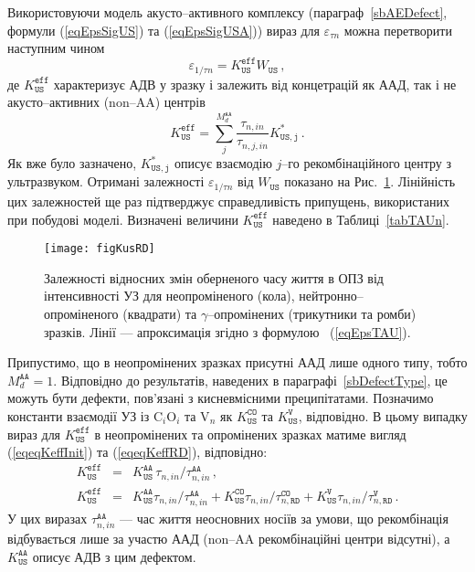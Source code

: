 Використовуючи модель акусто--активного комплексу (параграф~\ref{sbAEDefect}, формули (\ref{eqEpsSigUS}) та (\ref{eqEpsSigUSA}))
вираз для $\varepsilon_{\tau n}$ можна перетворити наступним чином
\begin{equation}
\label{eqEpsTAU}
\varepsilon_{1/\tau n}=K_\mathtt{US}^\mathtt{eff}W_\mathtt{US}\,,
\end{equation}
де
$K_\mathtt{US}^\mathtt{eff}$ характеризує АДВ у зразку і залежить від
концетрацій як ААД, так і не акусто--активних (non--AA) центрів
\begin{equation}
\label{eqKeff}
K_\mathtt{US}^\mathtt{eff}=\sum_j^{M_d^\mathtt{AA}}\frac{\tau_{n,in}}{\tau_{n,j,in}}K_\mathtt{US,j}^{*}\,.
\end{equation}
Як вже було зазначено, $K_\mathtt{US,j}^*$ описує взаємодію $j$--го рекомбінаційного центру з ультразвуком.
Отримані залежності $\varepsilon_{1/\tau n}$ від $W_\mathtt{US}$ показано на Рис.~\ref{figKusRD}.
Лінійність цих залежностей ще раз підтверджує справедливість припущень, використаних при побудові
моделі.
Визначені величини $K_\mathtt{US}^\mathtt{eff}$ наведено в Таблиці~\ref{tabTAUn}.


\begin{figure}
\center
\texttt{[image: figKusRD]}
\caption{\label{figKusRD}
Залежності відносних змін оберненого часу життя в ОПЗ від інтенсивності УЗ для
неопроміненого (кола), нейтронно--опроміненого (квадрати) та $\gamma$--опромінених (трикутники та ромби) зразків.
Лінії --- апроксимація згідно з формулою ~(\ref{eqEpsTAU}).
}%
\end{figure}

Припустимо,
що в неопромінених зразках присутні ААД лише одного типу, тобто $M_d^\mathtt{AA}=1$.
Відповідно до результатів, наведених в параграфі~\ref{sbDefectType}, це можуть бути дефекти, пов'язані з кисневмісними преципітатами.
Позначимо константи взаємодії УЗ із C$_i$O$_i$ та V$_n$ як $K_\mathtt{US}^\mathtt{CO}$ та $K_\mathtt{US}^\mathtt{V}$, відповідно.
В цьому випадку вираз для $K_\mathtt{US}^\mathtt{eff}$ в неопромінених та опромінених зразках
матиме вигляд (\ref{eqeqKeffInit}) та (\ref{eqeqKeffRD}), відповідно:
\begin{eqnarray}
K_\mathtt{US}^\mathtt{eff}&=&K_\mathtt{US}^\mathtt{AA}\,\tau_{n,in}/\tau_{n,in}^\mathtt{AA}\,,\label{eqeqKeffInit}\\
K_\mathtt{US}^\mathtt{eff}&=&K_\mathtt{US}^\mathtt{AA}\tau_{n,in}/\tau_{n,in}^\mathtt{AA}+
                           K_\mathtt{US}^\mathtt{CO}\tau_{n,in}/\tau_{n,\mathtt{RD}}^\mathtt{CO}+
                           K_\mathtt{US}^\mathtt{V}\tau_{n,in}/\tau_{n,\mathtt{RD}}^\mathtt{V} \,.\label{eqeqKeffRD}
\end{eqnarray}
У цих виразах $\tau_{n,in}^\mathtt{AA}$ --- час життя неосновних носіїв за умови, що рекомбінація
відбувається лише за участю ААД (non--AA рекомбінаційні центри відсутні),
а $K_\mathtt{US}^\mathtt{AA}$ описує АДВ з цим дефектом.


